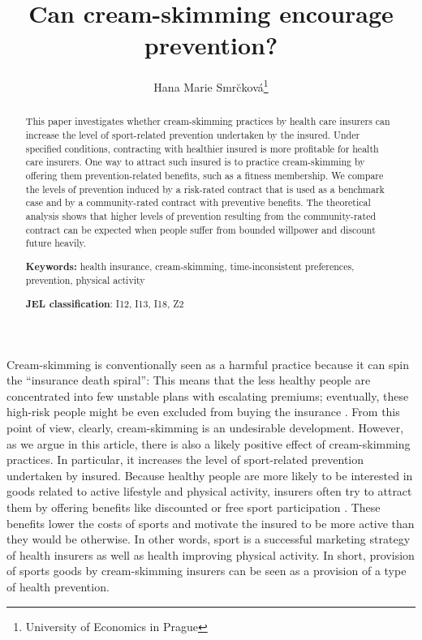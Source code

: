 \documentclass[12pt,english]{article}%
\makeatletter
\renewcommand{\section}{\@startsection{section}{1}{0mm}{-1.5\baselineskip}{0.8\baselineskip}{\normalfont\large\centering}}
\makeatother
\begin{document}
\title{Can cream-skimming encourage prevention?}
\author{Hana Marie Smr\u{c}kov\'{a}\thanks {University of Economics in Prague}}
\maketitle

\begin{abstract}
\noindent This paper investigates whether cream-skimming practices by health care insurers can increase the level of sport-related prevention undertaken by the insured. Under specified conditions, contracting with healthier insured is more profitable for health care insurers. One way to attract such insured is to practice cream-skimming by offering them prevention-related benefits, such as a fitness membership. We compare the levels of prevention induced by a risk-rated contract that is used as a benchmark case and by a community-rated contract with preventive benefits. The theoretical analysis shows that higher levels of prevention resulting from the community-rated contract can be expected when people suffer from bounded willpower and discount future heavily.
 
\medskip
\noindent\textbf{Keywords:} health insurance, cream-skimming, time-inconsistent preferences, prevention, physical activity

\medskip

\noindent\textbf{JEL classification}: I12, I13, I18, Z2

\end{abstract}

\newpage

\section{Introduction}
Cream-skimming is conventionally seen as a harmful practice because it can spin the “insurance death spiral”: This means that the less healthy people are concentrated into few unstable plans with escalating premiums; eventually, these high-risk people might be even excluded from buying the insurance \citep{cooper2012}. From this point of view, clearly, cream-skimming is an undesirable development. However, as we argue in this article, there is also a likely positive effect of cream-skimming practices. In particular, it increases the level of sport-related prevention undertaken by insured. Because healthy people are more likely to be interested in goods related to active lifestyle and physical activity, insurers often try to attract them by offering benefits like discounted or free sport participation \citep{paolucci2007}. These benefits lower the costs of sports and motivate the insured to be more active than they would be otherwise. In other words, sport is a successful marketing strategy of health insurers as well as health improving physical activity. In short, provision of sports goods by cream-skimming insurers can be seen as a provision of a type of health prevention.  
\end{document}
